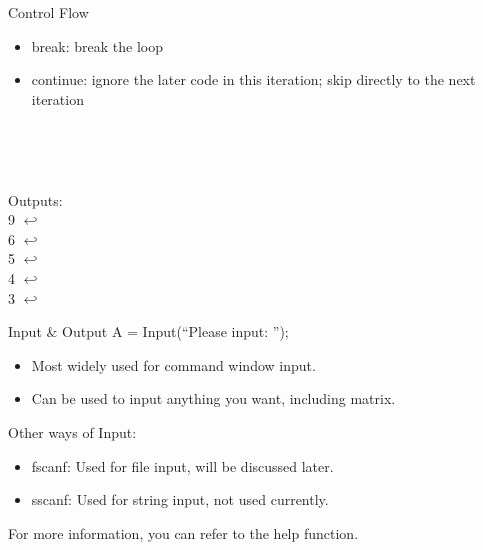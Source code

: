 \begin{frame}{Control Flow}
\begin{itemize}
\item break: break the loop
\item continue: ignore the later code in this iteration; skip directly to the next iteration
\end{itemize}
\begin{minipage}{0.05\textwidth}
~\\
\end{minipage}
\begin{minipage}{0.5\textwidth}

\end{minipage}
\begin{minipage}{0.05\textwidth}
~\\
\end{minipage}
\begin{minipage}{0.35\textwidth}
Outputs: \\
9 $\hookleftarrow$ \\
6 $\hookleftarrow$ \\
5 $\hookleftarrow$ \\
4 $\hookleftarrow$ \\
3 $\hookleftarrow$ \\
\end{minipage}
\end{frame}

\begin{frame}{Input \& Output}
A = Input(``Please input: '');
\begin{itemize}
\item Most widely used for command window input.
\item Can be used to input anything you want, including matrix.
\end{itemize}
Other ways of Input: 
\begin{itemize}
\item fscanf: Used for file input, will be discussed later.
\item sscanf: Used for string input, not used currently.
\end{itemize}
For more information, you can refer to the help function.
\end{frame}

